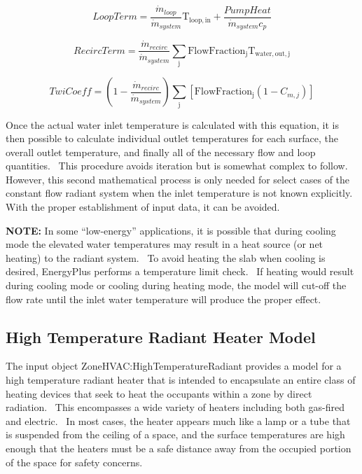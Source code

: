 \begin{equation}
LoopTerm = \frac{{{{\dot m}_{loop}}}}{{{{\dot m}_{system}}}}{{\mathrm{T}}_{{\mathrm{loop,in}}}} + \frac{{PumpHeat}}{{{{\dot m}_{system}}{c_p}}}
\end{equation}

\begin{equation}
RecircTerm = \frac{{{{\dot m}_{recirc}}}}{{{{\dot m}_{system}}}}\sum\limits_{\mathrm{j}} {{\mathrm{FlowFractio}}{{\mathrm{n}}_{\mathrm{j}}}{{\mathrm{T}}_{{\mathrm{water,out,j}}}}}
\end{equation}

\begin{equation}
TwiCoeff = \left( {1 - \frac{{{{\dot m}_{recirc}}}}{{{{\dot m}_{system}}}}} \right)\sum\limits_{\mathrm{j}} {\left[ {{\mathrm{FlowFractio}}{{\mathrm{n}}_{\mathrm{j}}}\left( {1 - {C_{m,j}}} \right)} \right]}
\end{equation}

Once the actual water inlet temperature is calculated with this equation, it is then possible to calculate individual outlet temperatures for each surface, the overall outlet temperature, and finally all of the necessary flow and loop quantities.~ This procedure avoids iteration but is somewhat complex to follow.~ However, this second mathematical process is only needed for select cases of the constant flow radiant system when the inlet temperature is not known explicitly.~ With the proper establishment of input data, it can be avoided.

\textbf{NOTE:} In some ``low-energy'' applications, it is possible that during cooling mode the elevated water temperatures may result in a heat source (or net heating) to the radiant system.~ To avoid heating the slab when cooling is desired, EnergyPlus performs a temperature limit check.~ If heating would result during cooling mode or cooling during heating mode, the model will cut-off the flow rate until the inlet water temperature will produce the proper effect.

\subsection{High Temperature Radiant Heater Model}\label{high-temperature-radiant-heater-model}

The input object ZoneHVAC:HighTemperatureRadiant provides a model for a high temperature radiant heater that is intended to encapsulate an entire class of heating devices that seek to heat the occupants within a zone by direct radiation.~ This encompasses a wide variety of heaters including both gas-fired and electric.~ In most cases, the heater appears much like a lamp or a tube that is suspended from the ceiling of a space, and the surface temperatures are high enough that the heaters must be a safe distance away from the occupied portion of the space for safety concerns.

